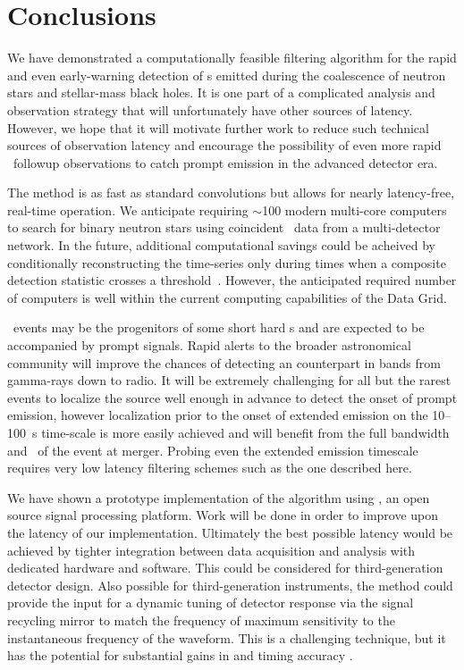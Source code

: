 \section{Conclusions}
\label{sec:conclusions}

We have demonstrated a computationally feasible filtering algorithm for the rapid and
even early-warning detection of \GW{}s emitted during the coalescence
of neutron stars and stellar-mass black holes.  It is one part of a complicated
analysis and observation strategy that will unfortunately have other sources of
latency.  However, we hope that it will motivate further work to reduce such
technical sources of \GW{} observation latency and encourage the possibility of
even more rapid \EM\ followup observations to catch prompt emission in the
advanced detector era.  

The \lloid{} method is as fast as standard \fft{} convolutions but allows for
nearly latency-free, real-time operation.  We anticipate requiring $\sim$100
modern multi-core computers to search for binary neutron stars using
coincident \GW\ data from a multi-detector network.  In the future, additional
computational savings could be acheived by conditionally reconstructing the
\SNR{} time-series only during times when a composite detection statistic
crosses a threshold~\citep{svd-compdetstat}.  However, the anticipated required
number of computers is well within the current computing capabilities of the
\LIGO{} Data Grid.

\CBC\ events may be the progenitors of some short hard \GRB{}s and are expected
to be accompanied by prompt \EM{} signals.  Rapid alerts to the broader
astronomical community will improve the chances of detecting an \EM{}
counterpart in bands from gamma-rays down to radio.  It will be extremely
challenging for all but the rarest events to localize the source well enough in
advance to detect the onset of prompt emission, however localization prior to
the onset of extended emission on the 10--100~s time-scale is more easily
achieved and will benefit from the full bandwidth and \SNR\ of the \GW{} event
at merger.  Probing even the extended emission timescale requires very low
latency filtering schemes such as the one described here.

We have shown a prototype implementation of the \lloid{} algorithm using
\gstreamer, an open source signal processing platform.  Work will be done in
order to improve upon the latency of our implementation.  Ultimately the best
possible latency would be achieved by tighter integration between data
acquisition and analysis with dedicated hardware and software. This could be
considered for third-generation detector design.  Also possible for
third-generation instruments, the \lloid{} method could provide the input for a
dynamic tuning of detector response via the signal recycling mirror to match
the frequency of maximum sensitivity to the instantaneous frequency of the
\GW{} waveform.  This is a challenging technique, but it has the potential for
substantial gains in \SNR{} and timing accuracy \citep{PhysRevD.47.2184}.

